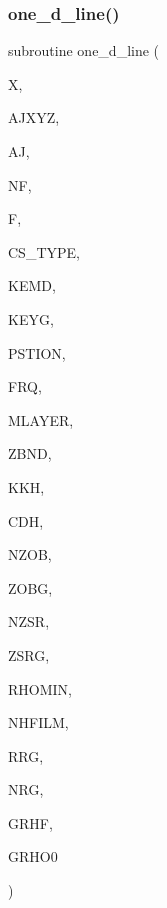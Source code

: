 \subsubsection{\texorpdfstring{one\+\_\+d\+\_\+line()}{one\_d\_line()}}
{\footnotesize\ttfamily subroutine one\+\_\+d\+\_\+line (\begin{DoxyParamCaption}\item[{real}]{X,  }\item[{real, intent(in)}]{A\+J\+X\+YZ,  }\item[{real, intent(in)}]{AJ,  }\item[{integer, intent(out)}]{NF,  }\item[{complex, dimension(6), intent(out)}]{F,  }\item[{integer, intent(in)}]{C\+S\+\_\+\+T\+Y\+PE,  }\item[{integer, intent(in)}]{K\+E\+MD,  }\item[{integer, intent(in)}]{K\+E\+YG,  }\item[{real, dimension(10), intent(in)}]{P\+S\+T\+I\+ON,  }\item[{real, intent(in)}]{F\+RQ,  }\item[{integer, intent(in)}]{M\+L\+A\+Y\+ER,  }\item[{real, dimension(0\+:mlayer), intent(in)}]{Z\+B\+ND,  }\item[{complex, dimension(0\+:mlayer), intent(in)}]{K\+KH,  }\item[{complex, dimension(0\+:mlayer), intent(in)}]{C\+DH,  }\item[{integer, intent(in)}]{N\+Z\+OB,  }\item[{real, dimension(nzob), intent(in)}]{Z\+O\+BG,  }\item[{integer, intent(in)}]{N\+Z\+SR,  }\item[{real, dimension(2,nzsr), intent(in)}]{Z\+S\+RG,  }\item[{real, intent(in)}]{R\+H\+O\+M\+IN,  }\item[{integer, intent(in)}]{N\+H\+F\+I\+LM,  }\item[{real, dimension(nrg), intent(in)}]{R\+RG,  }\item[{integer, intent(in)}]{N\+RG,  }\item[{complex, dimension(11,nhfilm,nzsr,nzob), intent(in)}]{G\+R\+HF,  }\item[{complex, dimension(4,nzsr,nzob), intent(in)}]{G\+R\+H\+O0 }\end{DoxyParamCaption})}

